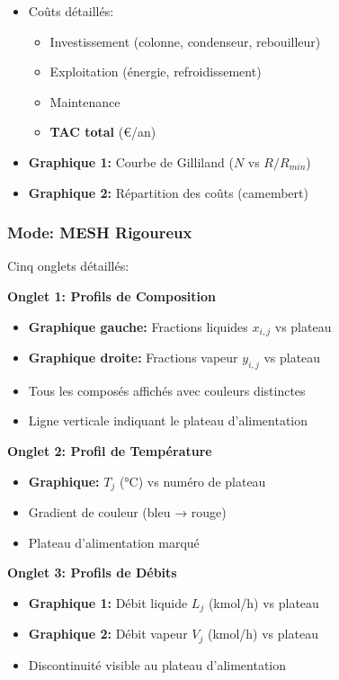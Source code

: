 \documentclass[11pt,a4paper]{article}
\begin{document}
\begin{itemize}[leftmargin=*]
    \item Coûts détaillés:
    \begin{itemize}
        \item Investissement (colonne, condenseur, rebouilleur)
        \item Exploitation (énergie, refroidissement)
        \item Maintenance
        \item \textbf{TAC total} (€/an)
    \end{itemize}
    \item \textbf{Graphique 1:} Courbe de Gilliland ($N$ vs $R/R_{min}$)
    \item \textbf{Graphique 2:} Répartition des coûts (camembert)
\end{itemize}

\subsubsection{Mode: MESH Rigoureux}

Cinq onglets détaillés:

\textbf{Onglet 1: Profils de Composition}

\begin{itemize}[leftmargin=*]
    \item \textbf{Graphique gauche:} Fractions liquides $x_{i,j}$ vs plateau
    \item \textbf{Graphique droite:} Fractions vapeur $y_{i,j}$ vs plateau
    \item Tous les composés affichés avec couleurs distinctes
    \item Ligne verticale indiquant le plateau d'alimentation
\end{itemize}

\textbf{Onglet 2: Profil de Température}

\begin{itemize}[leftmargin=*]
    \item \textbf{Graphique:} $T_j$ (°C) vs numéro de plateau
    \item Gradient de couleur (bleu → rouge)
    \item Plateau d'alimentation marqué
\end{itemize}

\textbf{Onglet 3: Profils de Débits}

\begin{itemize}[leftmargin=*]
    \item \textbf{Graphique 1:} Débit liquide $L_j$ (kmol/h) vs plateau
    \item \textbf{Graphique 2:} Débit vapeur $V_j$ (kmol/h) vs plateau
    \item Discontinuité visible au plateau d'alimentation
\end{itemize}
\end{document}
